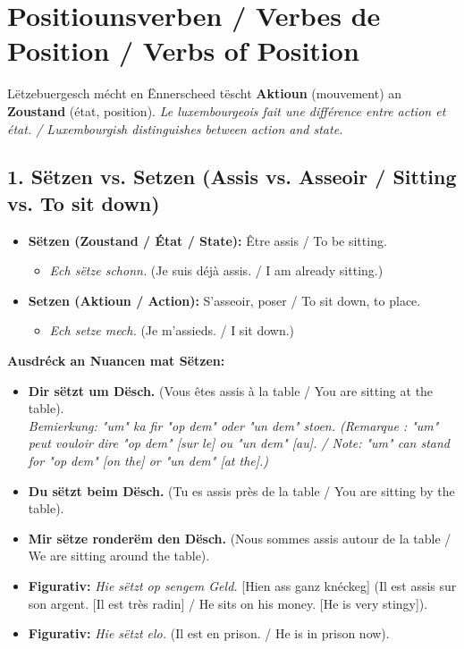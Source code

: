 \vspace{1cm}

\section{Positiounsverben / Verbes de Position / Verbs of Position}

Lëtzebuergesch mécht en Ënnerscheed tëscht \textbf{Aktioun} (mouvement) an \textbf{Zoustand} (état, position). \textit{Le luxembourgeois fait une différence entre action et état. / Luxembourgish distinguishes between action and state.}

\subsection*{1. Sëtzen vs. Setzen (Assis vs. Asseoir / Sitting vs. To sit down)}
\begin{itemize}
    \item \textbf{Sëtzen (Zoustand / État / State):} Être assis / To be sitting.
        \begin{itemize}
            \item \textit{Ech sëtze schonn.} (Je suis déjà assis. / I am already sitting.)
        \end{itemize}
    \item \textbf{Setzen (Aktioun / Action):} S'asseoir, poser / To sit down, to place.
        \begin{itemize}
            \item \textit{Ech setze mech.} (Je m'assieds. / I sit down.)
        \end{itemize}
\end{itemize}

\textbf{Ausdréck an Nuancen mat Sëtzen:}
\begin{itemize}
    \item \textbf{Dir sëtzt um Dësch.} (Vous êtes assis à la table / You are sitting at the table). \\ \textit{Bemierkung: "um" ka fir "op dem" oder "un dem" stoen. (Remarque : "um" peut vouloir dire "op dem" [sur le] ou "un dem" [au]. / Note: "um" can stand for "op dem" [on the] or "un dem" [at the].)}
    \item \textbf{Du sëtzt beim Dësch.} (Tu es assis près de la table / You are sitting by the table).
    \item \textbf{Mir sëtze ronderëm den Dësch.} (Nous sommes assis autour de la table / We are sitting around the table).
    \item \textbf{Figurativ:} \textit{Hie sëtzt op sengem Geld.} [Hien ass ganz knéckeg] (Il est assis sur son argent. [Il est très radin] / He sits on his money. [He is very stingy]).
    \item \textbf{Figurativ:} \textit{Hie sëtzt elo.} (Il est en prison. / He is in prison now).
\end{itemize}

